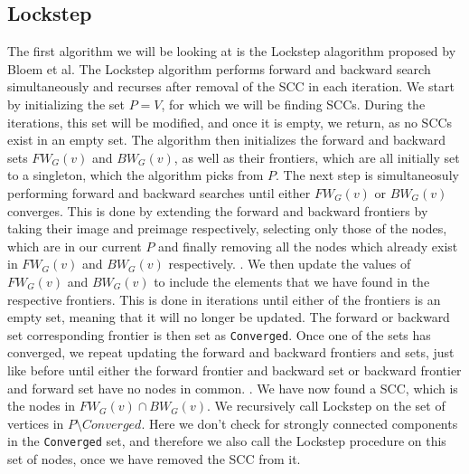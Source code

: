 \documentclass[../master.tex]{subfiles}
\newcommand{\FW}[2][G]{\ensuremath{FW_{#1}(#2)}}
\newcommand{\BW}[2][G]{\ensuremath{BW_{#1}(#2)}}
\begin{document}
\subsection{Lockstep}
The first algorithm we will be looking at is the Lockstep alagorithm proposed by Bloem et al. \cite{lockstep} The Lockstep algorithm performs forward and backward search simultaneously and recurses after removal of the SCC in each iteration.
We start by initializing the set $P=V$, for which we will be finding SCCs. During the iterations, this set will be modified, and once it is empty, we return, as no SCCs exist in an empty set. The algorithm then initializes the forward and backward sets \FW{v} and \BW{v}, as well as their frontiers, which are all initially set to a singleton, which the algorithm picks from $P$.
The next step is simultaneosuly performing forward and backward searches until either \FW{v} or \BW{v} converges. This is done by extending the forward and backward frontiers by  taking their image and preimage respectively, selecting only those of the nodes, which are in our current $P$ and finally removing all the nodes which already exist in \FW{v} and \BW{v} respectively. . We then update the values of \FW{v} and \BW{v} to include the elements that we have found in the respective frontiers. This is done in iterations until either of the frontiers is an empty set, meaning that it will no longer be updated. The forward or backward set corresponding frontier is then set as \texttt{Converged}.
Once one of the sets has converged, we repeat updating the forward and backward frontiers and sets, just like before until either the forward frontier and backward set or backward frontier and forward set have no nodes in common. .
We have now found a SCC, which is the nodes in $\FW{v}\cap\BW{v}$.
We recursively call Lockstep on the set of vertices in $P\setminus Converged$. Here we don't check for strongly connected components in the \texttt{Converged} set, and therefore we also call the Lockstep procedure on this set of nodes, once we have removed the SCC from it.
\end{document}

